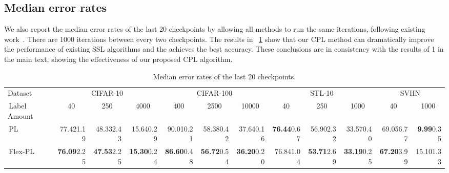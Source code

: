 \subsection{Median error rates}
We also report the median error rates of the last 20 checkpoints by allowing all methods to run the same iterations, following existing work~\cite{sohn2020fixmatch}. There are 1000 iterations between every two checkpoints.
The results in \tablename~\ref{table:main median table} show that our CPL method can dramatically improve the performance of existing SSL algorithms and the \method achieves the best accuracy. These conclusions are in consistency with the results of \tablename 1 in the main text, showing the effectiveness of our proposed CPL algorithm.
\begin{table}[hbp!]
\centering
\caption{Median error rates of the last 20 checkpoints.}
\label{table:main median table}
\begin{adjustbox}{width=\columnwidth,center}
\begin{tabular}{@{}l|rrr|rrr|rrr|rr@{}}
\toprule Dataset & \multicolumn{3}{c|}{CIFAR-10}& \multicolumn{3}{c|}{CIFAR-100}& \multicolumn{3}{c|}{STL-10} & \multicolumn{2}{c}{SVHN} \\ \cmidrule(r){1-1}\cmidrule(lr){2-4}\cmidrule(lr){5-7}\cmidrule(lr){8-10}\cmidrule(l){11-12}
 \,Label Amount & \multicolumn{1}{c}{40} & \multicolumn{1}{c}{250}  & \multicolumn{1}{c|}{4000} & \multicolumn{1}{c}{400}  & \multicolumn{1}{c}{2500}  & \multicolumn{1}{c|}{10000} & \multicolumn{1}{c}{40}  & \multicolumn{1}{c}{250}   & \multicolumn{1}{c|}{1000} & \multicolumn{1}{c}{40} & \multicolumn{1}{c}{1000}\\ \cmidrule(r){1-1}\cmidrule(lr){2-4}\cmidrule(lr){5-7}\cmidrule(lr){8-10} \cmidrule(l){11-12}
 
 \,PL  & 77.42{\scriptsize 1.19}  & 48.33{\scriptsize 2.43}  & 15.64{\scriptsize 0.29}  & 90.01{\scriptsize 0.21}  & 58.38{\scriptsize 0.42}  & 37.64{\scriptsize 0.16}  & \textbf{76.44}{\scriptsize 0.67}  & 56.90{\scriptsize 2.32}  & 33.57{\scriptsize 0.40}  & 69.05{\scriptsize 6.77}  & \textbf{9.99}{\scriptsize 0.35}  
\\
 \,Flex-PL  & \textbf{76.09}{\scriptsize 2.25}  & \textbf{47.53}{\scriptsize 2.25}  & \textbf{15.30}{\scriptsize 0.24}  & \textbf{86.60}{\scriptsize 0.48}  & \textbf{56.72}{\scriptsize 0.54}  & \textbf{36.20}{\scriptsize 0.20}  & 76.84{\scriptsize 1.04}  & \textbf{53.71}{\scriptsize 2.69}  & \textbf{33.19}{\scriptsize 0.25}  & \textbf{67.20}{\scriptsize 3.99}  & 15.10{\scriptsize 1.33}  
\\ \cmidrule(r){1-1}\cmidrule(lr){2-4}\cmidrule(lr){5-7}\cmidrule(lr){8-10} \cmidrule(l){11-12}
 

\end{tabular}
\end{adjustbox}
\end{table}
